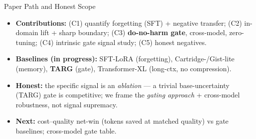 \begin{frame}{Paper Path and Honest Scope}
  \begin{itemize}
    \item \textbf{Contributions:} (C1) quantify forgetting (SFT) + negative transfer; (C2) in-domain lift + sharp boundary; (C3) \textbf{do-no-harm gate}, cross-model, zero-tuning; (C4) intrinsic gate signal study; (C5) honest negatives.
    \item \textbf{Baselines (in progress):} SFT-LoRA (forgetting), Cartridge-/Gist-lite (memory), \textbf{TARG} (gate), Transformer-XL (long-ctx, no compression).
    \item \textbf{Honest:} the specific signal is an \emph{ablation} --- a trivial base-uncertainty (TARG) gate is competitive; we frame the \emph{gating approach} + cross-model robustness, not signal supremacy.
    \item \textbf{Next:} cost--quality net-win (tokens saved at matched quality) vs gate baselines; cross-model gate table.
  \end{itemize}
\end{frame}
